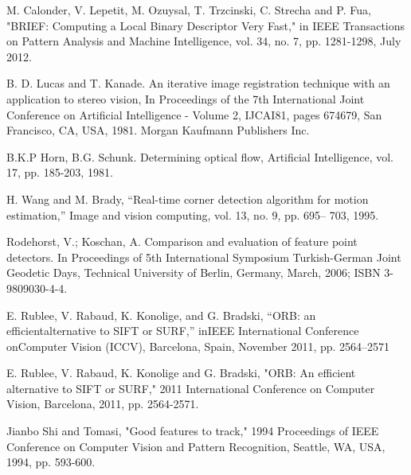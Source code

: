 \documentclass{easychair}
\begin{document}
\begin{thebibliography}{00}
	
	M. Calonder, V. Lepetit, M. Ozuysal, T. Trzcinski, C. Strecha and P. Fua, "BRIEF: Computing a Local Binary Descriptor Very Fast," in IEEE Transactions on Pattern Analysis and Machine Intelligence, vol. 34, no. 7, pp. 1281-1298, July 2012.
	
	 B. D. Lucas and T. Kanade. An iterative image registration technique
	with an application to stereo vision, In Proceedings of the 7th International
	Joint Conference on Artificial Intelligence - Volume 2, IJCAI81,
	pages 674679, San Francisco, CA, USA, 1981. Morgan Kaufmann
	Publishers Inc.
	
	 B.K.P Horn, B.G. Schunk. Determining optical flow, Artificial Intelligence,
	vol. 17, pp. 185-203, 1981.
	
	
	 H. Wang and M. Brady, “Real-time corner detection algorithm for
	motion estimation,” Image and vision computing, vol. 13, no. 9, pp. 695–
	703, 1995.
	
	 Rodehorst, V.; Koschan, A. Comparison and evaluation of feature point detectors. In Proceedings
	of 5th International Symposium Turkish-German Joint Geodetic Days, Technical University of
	Berlin, Germany, March, 2006; ISBN 3-9809030-4-4.
	
	 E. Rublee, V. Rabaud, K. Konolige, and G. Bradski, “ORB: an efficientalternative  to  SIFT  or  SURF,”  inIEEE  International  Conference  onComputer Vision (ICCV), Barcelona, Spain, November 2011, pp. 2564–2571
	
	 E. Rublee, V. Rabaud, K. Konolige and G. Bradski, "ORB: An efficient alternative to SIFT or SURF," 2011 International Conference on Computer Vision, Barcelona, 2011, pp. 2564-2571.
	
	 Jianbo Shi and Tomasi, "Good features to track," 1994 Proceedings of IEEE Conference on Computer Vision and Pattern Recognition, Seattle, WA, USA, 1994, pp. 593-600.
	
	
	
\end{thebibliography}



%
%
%
%
%
\end{document}
